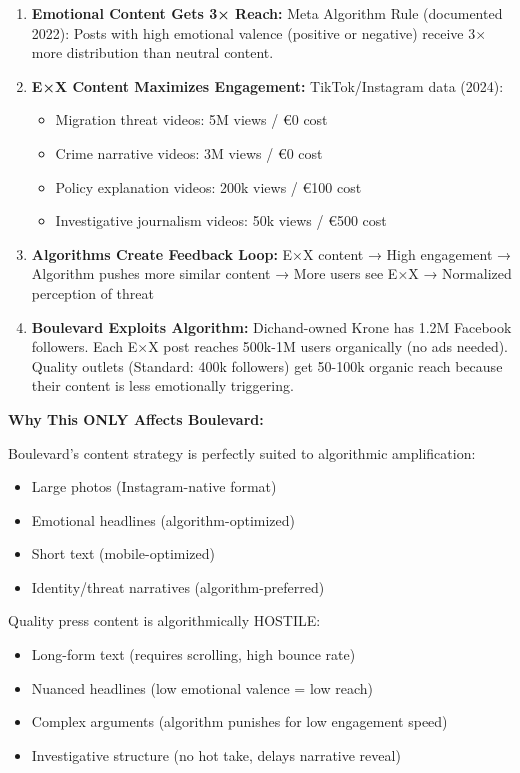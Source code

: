 \begin{enumerate}
\item \textbf{Emotional Content Gets 3× Reach:} Meta Algorithm Rule (documented 2022): Posts with high
  emotional valence (positive or negative) receive 3× more distribution than neutral content.

\item \textbf{E×X Content Maximizes Engagement:} TikTok/Instagram data (2024):
  \begin{itemize}
  \item Migration threat videos: 5M views / €0 cost
  \item Crime narrative videos: 3M views / €0 cost
  \item Policy explanation videos: 200k views / €100 cost
  \item Investigative journalism videos: 50k views / €500 cost
  \end{itemize}

\item \textbf{Algorithms Create Feedback Loop:} E×X content → High engagement → Algorithm pushes
  more similar content → More users see E×X → Normalized perception of threat

\item \textbf{Boulevard Exploits Algorithm:} Dichand-owned Krone has 1.2M Facebook followers.
  Each E×X post reaches 500k-1M users organically (no ads needed). Quality outlets (Standard: 400k
  followers) get 50-100k organic reach because their content is less emotionally triggering.
\end{enumerate}

\textbf{Why This ONLY Affects Boulevard:}

Boulevard's content strategy is perfectly suited to algorithmic amplification:
\begin{itemize}
\item Large photos (Instagram-native format)
\item Emotional headlines (algorithm-optimized)
\item Short text (mobile-optimized)
\item Identity/threat narratives (algorithm-preferred)
\end{itemize}

Quality press content is algorithmically HOSTILE:
\begin{itemize}
\item Long-form text (requires scrolling, high bounce rate)
\item Nuanced headlines (low emotional valence = low reach)
\item Complex arguments (algorithm punishes for low engagement speed)
\item Investigative structure (no hot take, delays narrative reveal)
\end{itemize}


